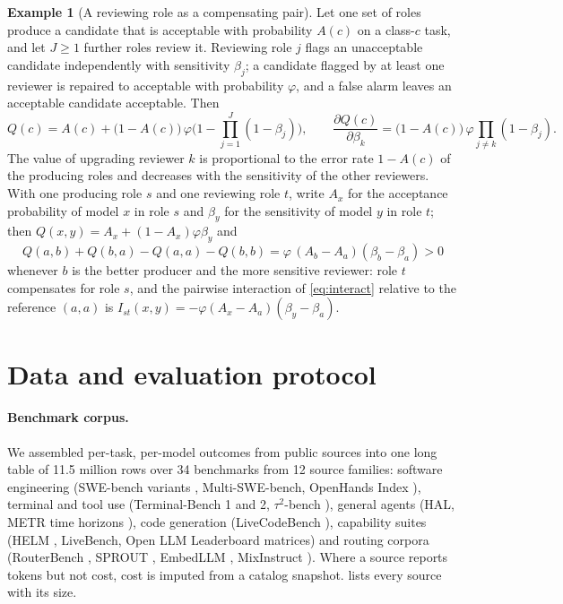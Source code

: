 \documentclass[11pt,a4paper]{article}
\theoremstyle{definition}
\theoremstyle{remark}
\theoremstyle{definition}
\newtheorem{example}{Example}
\begin{document}
\begin{example}[A reviewing role as a compensating pair]
\label{ex:verify}
Let one set of roles produce a candidate that is acceptable with probability $A(c)$ on a class-$c$ task, and let $J\ge1$ further roles review it. Reviewing role $j$ flags an unacceptable candidate independently with sensitivity $\beta_j$; a candidate flagged by at least one reviewer is repaired to acceptable with probability $\varphi$, and a false alarm leaves an acceptable candidate acceptable. Then
\[
Q(c)=A(c)+\big(1-A(c)\big)\,\varphi\Big(1-\prod_{j=1}^{J}(1-\beta_j)\Big),\qquad
\frac{\partial Q(c)}{\partial\beta_k}=\big(1-A(c)\big)\,\varphi\prod_{j\ne k}(1-\beta_j).
\]
The value of upgrading reviewer $k$ is proportional to the error rate $1-A(c)$ of the producing roles and decreases with the sensitivity of the other reviewers. With one producing role $s$ and one reviewing role $t$, write $A_x$ for the acceptance probability of model $x$ in role $s$ and $\beta_y$ for the sensitivity of model $y$ in role $t$; then $Q(x,y)=A_x+(1-A_x)\varphi\beta_y$ and
\[
Q(a,b)+Q(b,a)-Q(a,a)-Q(b,b)=\varphi\,(A_b-A_a)(\beta_b-\beta_a)>0
\]
whenever $b$ is the better producer and the more sensitive reviewer: role $t$ compensates for role $s$, and the pairwise interaction of \eqref{eq:interact} relative to the reference $(a,a)$ is $I_{st}(x,y)=-\varphi(A_x-A_a)(\beta_y-\beta_a)$.
\end{example}

\section{Data and evaluation protocol}
\label{sec:data}

\paragraph{Benchmark corpus.}
We assembled per-task, per-model outcomes from public sources into one long table of 11.5 million rows over 34 benchmarks from 12 source families: software engineering (SWE-bench variants \cite{jimenez2024swebench}, Multi-SWE-bench, OpenHands Index \cite{wang2025openhands}), terminal and tool use (Terminal-Bench 1 and 2, $\tau^2$-bench \cite{yao2024taubench}), general agents (HAL, METR time horizons \cite{kwa2025metr}), code generation (LiveCodeBench \cite{jain2025livecodebench}), capability suites (HELM \cite{liang2023helm}, LiveBench, Open LLM Leaderboard matrices) and routing corpora (RouterBench \cite{hu2024routerbench}, SPROUT \cite{somerstep2025carrot}, EmbedLLM \cite{zhuang2025embedllm}, MixInstruct \cite{jiang2023blender}). Where a source reports tokens but not cost, cost is imputed from a catalog snapshot.  lists every source with its size.
\end{document}
